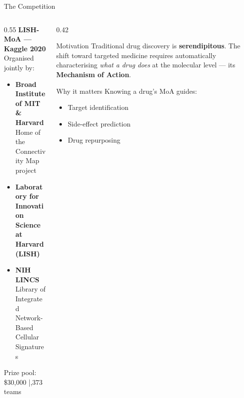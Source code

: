 \documentclass[aspectratio=169, 10pt]{beamer}
\begin{document}
\begin{frame}{The Competition}
  \begin{columns}[T]
    \begin{column}{0.55\textwidth}
      \textbf{LISH-MoA — Kaggle 2020}\\[0.5em]
      Organised jointly by:
      \begin{itemize}
        \item \textbf{Broad Institute of MIT \& Harvard}\\
              Home of the Connectivity Map project
        \item \textbf{Laboratory for Innovation Science\\
              at Harvard (LISH)}
        \item \textbf{NIH LINCS}\\
              Library of Integrated Network-Based\\
              Cellular Signatures
      \end{itemize}
      \vspace{0.6em}
      Prize pool: \$30,000 \quad|,373 teams
    \end{column}
    \begin{column}{0.42\textwidth}
      \begin{block}{Motivation}
        Traditional drug discovery is \textbf{serendipitous}.
        The shift toward targeted medicine requires
        automatically characterising \emph{what a drug does}
        at the molecular level — its \textbf{Mechanism of Action}.
      \end{block}
      \vspace{0.5em}
      \begin{alertblock}{Why it matters}
        Knowing a drug's MoA guides:
        \begin{itemize}
          \item Target identification
          \item Side-effect prediction
          \item Drug repurposing
        \end{itemize}
      \end{alertblock}
    \end{column}
  \end{columns}
\end{frame}
\end{document}
